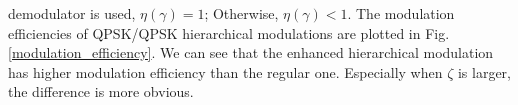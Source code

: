 \documentclass[10pt,fleqn, twocolumn]{IEEEtran}
\begin{document}
demodulator is used, $\eta\left(\gamma\right)=1$; Otherwise,
$\eta\left(\gamma\right)<1$. The modulation efficiencies of
QPSK/QPSK hierarchical modulations are plotted in Fig.
\ref{modulation_efficiency}. We can see that the enhanced
hierarchical modulation has higher modulation efficiency than the
regular one. Especially when $\zeta$ is larger, the difference is
more obvious.
\begin{figure}
\end{figure}
\end{document}
